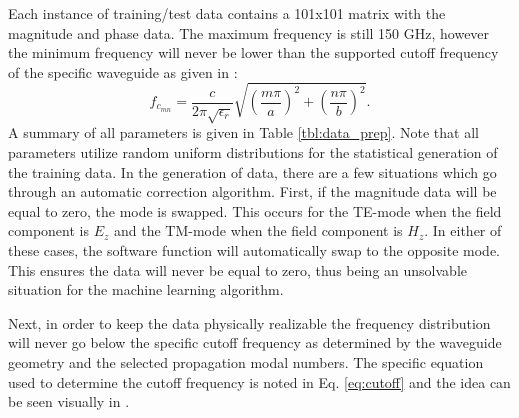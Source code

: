 \documentclass[conference]{IEEEtran}
\begin{document}
Each instance of training/test data contains a 101x101 matrix with the magnitude and phase data. The maximum frequency is still 150 GHz, however the minimum frequency will never be lower than the supported cutoff frequency of the specific waveguide as given in \cite[eq. 3.84]{pozar_microwave_2012}:
\begin{equation}\label{eq:cutoff}
	f_{c_{mn}} = \frac{c}{2\pi\sqrt{\epsilon_{r}}}\sqrt{\left(\frac{m\pi}{a}\right)^2+\left(\frac{n\pi}{b}\right)^2}.	
\end{equation}
A summary of all parameters is given in Table \ref{tbl:data_prep}.
Note that all parameters utilize random uniform distributions for the statistical generation of the training data.
In the generation of data, there are a few situations which go through an automatic correction algorithm. 
First, if the magnitude data will be equal to zero, the mode is swapped. 
This occurs for the TE-mode when the field component is $E_z$ and the TM-mode when the field component is $H_z$.
In either of these cases, the software function will automatically swap to the opposite mode.
This ensures the data will never be equal to zero, thus being an unsolvable situation for the machine learning algorithm. 
\begin{table}
	\centering
	\caption{Configuration of training and test data fields.}
	\setlength\extrarowheight{2pt}
	\label{tbl:data_prep}
\end{table}
Next, in order to keep the data physically realizable the frequency distribution will never go below the specific cutoff frequency as determined by the waveguide geometry and the selected propagation modal numbers. The specific equation used to determine the cutoff frequency is noted in Eq. \ref{eq:cutoff} and the idea can be seen visually in \cite[Figure 3.8]{pozar_microwave_2012}.
\end{document}
